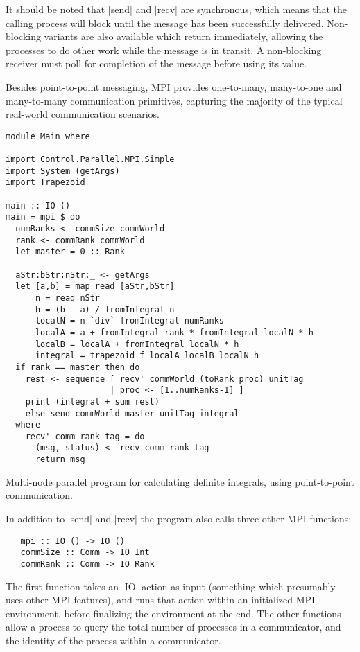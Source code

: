 \documentclass{tmr}
\begin{document}
It should be noted that |send| and |recv| are synchronous,
which means that the calling process will block until the message has been
successfully delivered. Non-blocking variants are also available which
return immediately, allowing the processes to do other work while
the message is in transit. A non-blocking receiver must poll for
completion of the message before using its value.

Besides point-to-point messaging, MPI
provides one-to-many, many-to-one and many-to-many communication
primitives, capturing the majority of the typical real-world communication
scenarios.

\begin{listing}
\begin{Verbatim}
module Main where

import Control.Parallel.MPI.Simple
import System (getArgs)
import Trapezoid

main :: IO ()
main = mpi $ do
  numRanks <- commSize commWorld
  rank <- commRank commWorld
  let master = 0 :: Rank

  aStr:bStr:nStr:_ <- getArgs
  let [a,b] = map read [aStr,bStr]
      n = read nStr
      h = (b - a) / fromIntegral n
      localN = n `div` fromIntegral numRanks
      localA = a + fromIntegral rank * fromIntegral localN * h
      localB = localA + fromIntegral localN * h
      integral = trapezoid f localA localB localN h
  if rank == master then do
    rest <- sequence [ recv' commWorld (toRank proc) unitTag
                     | proc <- [1..numRanks-1] ]
    print (integral + sum rest)
    else send commWorld master unitTag integral
  where
    recv' comm rank tag = do
      (msg, status) <- recv comm rank tag
      return msg
\end{Verbatim}
\caption{Multi-node parallel program for calculating definite
  integrals, using point-to-point communication. \label{mpi-p2p}}
\end{listing}

In addition to |send| and |recv| the program also calls three other MPI functions:
\begin{Verbatim}
   mpi :: IO () -> IO ()
   commSize :: Comm -> IO Int
   commRank :: Comm -> IO Rank
\end{Verbatim}
The first function takes an |IO| action as input (something which presumably
uses other MPI features), and runs that action within an initialized MPI
environment, before finalizing the environment at the end. The other
functions allow a process to query the total number of processes in a
communicator, and the identity of the process within a communicator.
\end{document}
